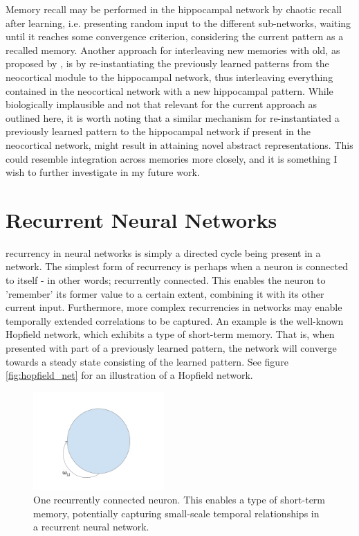 Memory recall may be performed in the hippocampal network by chaotic recall after learning, i.e. presenting random input to the different sub-networks, waiting until it reaches some convergence criterion, considering the current pattern as a recalled memory. Another approach for interleaving new memories with old, as proposed by \cite{French1997}, is by re-instantiating the previously learned patterns from the neocortical module to the hippocampal network, thus interleaving everything contained in the neocortical network with a new hippocampal pattern. While biologically implausible and not that relevant for the current approach as outlined here, it is worth noting that a similar mechanism for re-instantiated a previously learned pattern to the hippocampal network if present in the neocortical network, might result in attaining novel abstract representations. This could resemble integration across memories more closely, and it is something I wish to further investigate in my future work.



\section{Recurrent Neural Networks}

recurrency in neural networks is simply a directed cycle being present in a network. The simplest form of recurrency is perhaps when a neuron is connected to itself - in other words; recurrently connected. This enables the neuron to 'remember' its former value to a certain extent, combining it with its other current input. Furthermore, more complex recurrencies in networks may enable temporally extended correlations to be captured. An example is the well-known Hopfield network, which exhibits a type of short-term memory. That is, when presented with part of a previously learned pattern, the network will converge towards a steady state consisting of the learned pattern. See figure \ref{fig:hopfield_net} for an illustration of a Hopfield network.

\begin{figure}
\centering
\includegraphics[width=5cm]{fig/one_recurrent_neuron}
\caption{One recurrently connected neuron. This enables a type of short-term memory, potentially capturing small-scale temporal relationships in a recurrent neural network.}
\label{fig:one_recurrent_neuron}
\end{figure}


